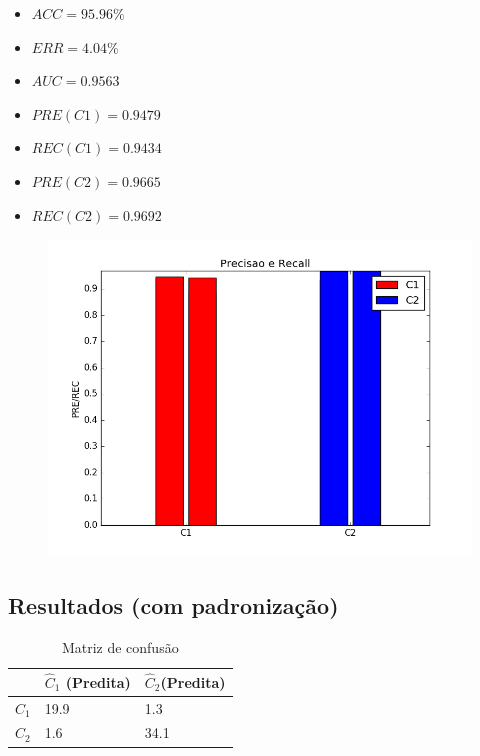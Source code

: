 \documentclass[11pt,a4paper]{article}
\numberwithin{equation}{section}
\begin{document}
\begin{minipage}{.5\textwidth}
\begin{itemize}
\item $ACC = 95.96 \%$
\item $ERR =  4.04 \%$
\item $AUC = 0.9563 $
\item $PRE(C1) = 0.9479$
\item $REC(C1) = 0.9434$
\item $PRE(C2) = 0.9665$
\item $REC(C2) = 0.9692$
\end{itemize}
\end{minipage}%
\begin{minipage}{.5\textwidth}
\begin{figure}[H]
\centering
  \includegraphics[width=\linewidth]{../img/log_reg_rec.png}
  \label{fig:percep}
\end{figure}
\end{minipage}%

\subsection{Resultados (com padronização)}

\begin{table}[H]
\centering
\caption{Matriz de confusão}
\begin{tabular}{l l l}
\hline
 & \textbf{$\hat{C}_1$ (Predita)} & \textbf{$\hat{C}_2$(Predita)}\\
\hline
$C_1$ &  19.9 & 1.3 \\
$C_2$ &  1.6 & 34.1 \\
\end{tabular}
\end{table}
\end{document}
